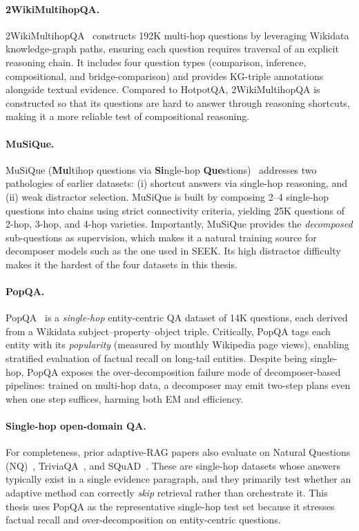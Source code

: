 \paragraph{2WikiMultihopQA.}

2WikiMultihopQA~\cite{twowiki} constructs 192K multi-hop questions by leveraging Wikidata knowledge-graph paths, ensuring each question requires traversal of an explicit reasoning chain. It includes four question types (comparison, inference, compositional, and bridge-comparison) and provides KG-triple annotations alongside textual evidence. Compared to HotpotQA, 2WikiMultihopQA is constructed so that its questions are hard to answer through reasoning shortcuts, making it a more reliable test of compositional reasoning.

\paragraph{MuSiQue.}

MuSiQue (\textbf{Mu}ltihop questions via \textbf{Si}ngle-hop \textbf{Que}stions)~\cite{musique} addresses two pathologies of earlier datasets: (i) shortcut answers via single-hop reasoning, and (ii) weak distractor selection. MuSiQue is built by composing 2--4 single-hop questions into chains using strict connectivity criteria, yielding 25K questions of 2-hop, 3-hop, and 4-hop varieties. Importantly, MuSiQue provides the \emph{decomposed} sub-questions as supervision, which makes it a natural training source for decomposer models such as the one used in SEEK. Its high distractor difficulty makes it the hardest of the four datasets in this thesis.

\paragraph{PopQA.}

PopQA~\cite{popqa} is a \emph{single-hop} entity-centric QA dataset of 14K questions, each derived from a Wikidata subject--property--object triple. Critically, PopQA tags each entity with its \emph{popularity} (measured by monthly Wikipedia page views), enabling stratified evaluation of factual recall on long-tail entities. Despite being single-hop, PopQA exposes the over-decomposition failure mode of decomposer-based pipelines: trained on multi-hop data, a decomposer may emit two-step plans even when one step suffices, harming both EM and efficiency.

\paragraph{Single-hop open-domain QA.}

For completeness, prior adaptive-RAG papers also evaluate on Natural Questions (NQ)~\cite{nq}, TriviaQA~\cite{triviaqa}, and SQuAD~\cite{squad}. These are single-hop datasets whose answers typically exist in a single evidence paragraph, and they primarily test whether an adaptive method can correctly \emph{skip} retrieval rather than orchestrate it. This thesis uses PopQA as the representative single-hop test set because it stresses factual recall and over-decomposition on entity-centric questions.

